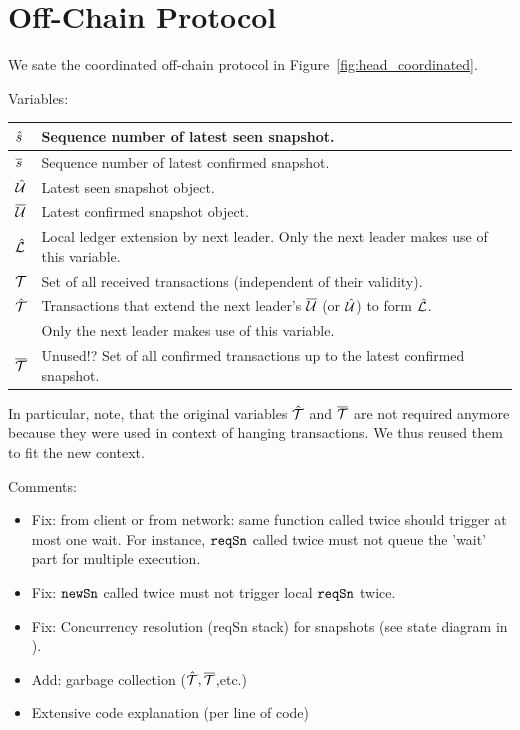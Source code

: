 \section{Off-Chain Protocol}

We sate the coordinated off-chain protocol in Figure~\ref{fig:head_coordinated}.

Variables:

\begin{center}
\begin{tabular}{|l|l|}\hline
  $\hat s$  & Sequence number of latest seen snapshot. \\ \hline
  $\overline s$  & Sequence number of latest confirmed snapshot. \\ \hline
  $\hat {\mathcal U}$ & Latest seen snapshot object. \\ \hline
  $\overline {\mathcal U}$ & Latest confirmed snapshot object. \\ \hline
  $\hat {\mathcal L}$ & Local ledger extension by next leader. Only the next leader
  makes use of this variable.\\ \hline
  ${\mathcal T}$    & Set of all received transactions (independent of their validity).\\  \hline
  $\hat {\mathcal T}$ & Transactions that extend the next leader's $\overline {\mathcal U}$ (or $\hat {\mathcal U}$) to form $\hat {\mathcal L}$.\\
           & Only the next leader makes use of this variable.\\  \hline
  $\overline {\mathcal T}$ & Unused!? Set of all confirmed transactions up to the latest confirmed snapshot.\\  \hline
\end{tabular}
\end{center}

In particular, note, that the original variables $\hat {\mathcal T}$ and $\overline {\mathcal T}$ are not required anymore because they
were used in context of hanging transactions. We thus reused them to fit the new context.



Comments: 
\begin{itemize}
\item Fix: from client or from network: same function called twice should trigger at most one wait.
  For instance, $\mathtt{reqSn}$ called twice must not queue the 'wait' part for multiple execution.
\item Fix: $\mathtt{newSn}$ called twice must not trigger local $\mathtt{reqSn}$ twice.
\item Fix: Concurrency resolution (reqSn stack) for snapshots (see state diagram in \cite{hydraspec22}).
\item Add: garbage collection ($\hat {\mathcal T},\overline {\mathcal T}$,etc.)
\item Extensive code explanation (per line of code)
\end{itemize}


